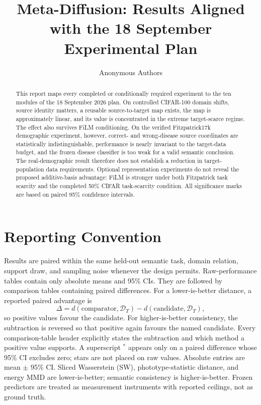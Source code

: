 \documentclass{article}
\title{Meta-Diffusion: Results Aligned with the 18 September Experimental Plan}
\author{Anonymous Authors}
\newcommand{\sigstar}{^{*}}
\begin{document}
\maketitle

\begin{abstract}
This report maps every completed or conditionally required experiment to the ten modules of the 18 September 2026 plan. On controlled CIFAR-100 domain shifts, source identity matters, a reusable source-to-target map exists, the map is approximately linear, and its value is concentrated in the extreme target-scarce regime. The effect also survives FiLM conditioning. On the verified Fitzpatrick17k demographic experiment, however, correct- and wrong-disease source coordinates are statistically indistinguishable, performance is nearly invariant to the target-data budget, and the frozen disease classifier is too weak for a valid semantic conclusion. The real-demographic result therefore does not establish a reduction in target-population data requirements. Optional representation experiments do not reveal the proposed additive-basis advantage: FiLM is stronger under both Fitzpatrick task scarcity and the completed 50\% CIFAR task-scarcity condition. All significance marks are based on paired 95\% confidence intervals.
\end{abstract}

\section{Reporting Convention}

Results are paired within the same held-out semantic task, domain relation, support draw, and sampling noise whenever the design permits. Raw-performance tables contain only absolute means and 95\% CIs. They are followed by comparison tables containing paired differences. For a lower-is-better distance, a reported paired advantage is
\begin{equation}
  \Delta=d(\text{comparator},\mathcal D_T)-d(\text{candidate},\mathcal D_T),
\end{equation}
so positive values favour the candidate. For higher-is-better consistency, the subtraction is reversed so that positive again favours the named candidate. Every comparison-table header explicitly states the subtraction and which method a positive value supports. A superscript $\sigstar$ appears only on a paired difference whose 95\% CI excludes zero; stars are not placed on raw values. Absolute entries are mean $\pm$ 95\% CI. Sliced Wasserstein (SW), phototype-statistic distance, and energy MMD are lower-is-better; semantic consistency is higher-is-better. Frozen predictors are treated as measurement instruments with reported ceilings, not as ground truth.
\end{document}
